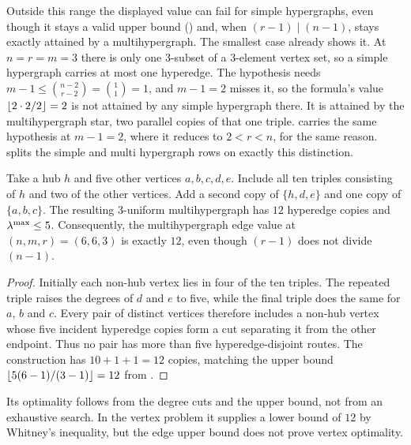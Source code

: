 \begin{remark}\label{rem:simple-hyper-necessary}
Outside this range the displayed value can fail for simple hypergraphs, even though it stays a valid upper bound () and, when $(r-1) \mid (n-1)$, stays exactly attained by a multihypergraph. The smallest case already shows it. At $n = r = m = 3$ there is only one $3$-subset of a $3$-element vertex set, so a simple hypergraph carries at most one hyperedge. The hypothesis needs $m - 1 \le \binom{n-2}{r-2} = \binom{1}{1} = 1$, and $m - 1 = 2$ misses it, so the formula's value $\left\lfloor 2 \cdot 2 / 2 \right\rfloor = 2$ is not attained by any simple hypergraph there. It is attained by the multihypergraph star, two parallel copies of that one triple.  carries the same hypothesis at $m - 1 = 2$, where it reduces to $2 < r < n$, for the same reason.  splits the simple and multi hypergraph rows on exactly this distinction.
\end{remark}

\begin{construction}\label{const:multihyper-six}
Take a hub $h$ and five other vertices $a,b,c,d,e$. Include all ten triples
consisting of $h$ and two of the other vertices. Add a second copy of
$\{h,d,e\}$ and one copy of $\{a,b,c\}$. The resulting $3$-uniform
multihypergraph has $12$ hyperedge copies and $\lambda^{\max}\le5$.
Consequently, the multihypergraph edge value at $(n,m,r)=(6,6,3)$ is exactly
$12$, even though $(r-1)$ does not divide $(n-1)$.
\end{construction}

\begin{proof}
Initially each non-hub vertex lies in four of the ten triples. The repeated
triple raises the degrees of $d$ and $e$ to five, while the final triple does
the same for $a$, $b$ and $c$. Every pair of distinct vertices therefore
includes a non-hub vertex whose five incident hyperedge copies form a cut
separating it from the other endpoint. Thus no pair has more than five
hyperedge-disjoint routes. The construction has $10+1+1=12$ copies, matching
the upper bound $\left\lfloor 5(6-1)/(3-1) \right\rfloor=12$ from .
\end{proof}

Its optimality follows from the degree
cuts and the upper bound, not from an exhaustive search. In the
vertex problem it supplies a lower bound of $12$ by Whitney's inequality,
but the edge upper bound does not prove vertex optimality.

